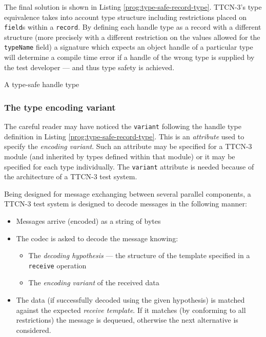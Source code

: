 \begin{program}
\caption{Type equivalence is based on type structure%
	\label{prog:type-structure-equivalence}}
\end{program}

The final solution is shown in Listing \ref{prog:type-safe-record-type}.
\ac{TTCN-3}'s type equivalence takes into account type structure
including restrictions placed on \verb=field=s within a \verb=record=.
By defining each handle type as a record with a different structure
(more precisely with a different restriction on the values allowed
for the \verb=typeName= field)
a signature which expects an object handle of a particular type
will determine a compile time error if a handle of the wrong type is supplied
by the test developer --- and thus type safety is achieved.

\begin{program}
\caption{A type-safe handle type\label{prog:type-safe-record-type}}
\end{program}


\subsubsection{The type encoding variant}
\label{sec:type-encoding-variant}

The careful reader may have noticed the \verb=variant=
following the handle type definition
in Listing \ref{prog:type-safe-record-type}.
This is an \emph{attribute} used to specify the \emph{encoding variant}.
Such an attribute may be specified for a \ac{TTCN-3} module
(and inherited by types defined within that module)
or it may be specified for each type individually.
The \verb=variant= attribute is needed because of the
architecture of a \ac{TTCN-3} test system.

Being designed for message exchanging between several parallel components,
a \ac{TTCN-3} test system is designed
to decode messages in the following manner:
\begin{itemize}
\item Messages arrive (encoded) as a string of bytes
\item The codec is asked to decode the message knowing:
	\begin{itemize}
	\item The \emph{decoding hypothesis} --- the structure of the template
	specified in a \verb=receive= operation
	\item The \emph{encoding variant} of the received data
	\end{itemize}
\item The data (if successfully decoded using the given hypothesis)
is matched against the expected \emph{receive template}.
If it matches (by conforming to all restrictions) the message is dequeued,
otherwise the next alternative is considered.
\end{itemize}

